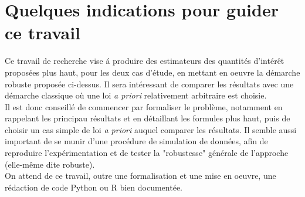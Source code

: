 \documentclass[10pt]{article}
\newcommand{\1}{\mathbbm{1}}
\begin{document}
\section{Quelques indications pour guider ce travail}


Ce travail de recherche vise \'a produire des estimateurs des quantit\'es d'int\'er\^et propos\'ees plus haut, pour les deux cas d'\'etude, en mettant en oeuvre la d\'emarche robuste propos\'ee ci-dessus. Il sera int\'eressant de comparer les r\'esultats avec une d\'emarche classique o\`u une loi {\it a priori} relativement arbitraire est choisie. \\

Il est donc conseill\'e de commencer par formaliser le probl\`eme, notamment en rappelant les principau r\'esultats et en d\'etaillant les formules plus haut, puis de choisir un cas simple de loi {\it a priori} auquel comparer les r\'esultats. Il semble aussi important de se munir d'une proc\'edure de simulation de donn\'ees, afin de reproduire l'exp\'erimentation et de tester la "robustesse" g\'en\'erale de l'approche (elle-m\^eme dite robuste). \\

On attend de ce travail, outre une formalisation et une mise en oeuvre, une r\'edaction de code Python ou R bien document\'ee. \\





\end{document}
